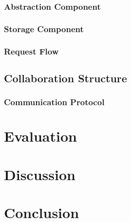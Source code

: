\documentclass[11pt]{report}
\begin{document}
\subsection{Abstraction Component}

\subsection{Storage Component}

\subsection{Request Flow}

\section{Collaboration Structure}

\subsection{Communication Protocol}


\chapter{Evaluation}


\chapter{Discussion}


\chapter{Conclusion}
\end{document}
